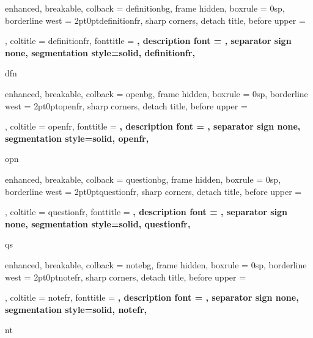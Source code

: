 {%
    enhanced,
    breakable,
    colback = definitionbg,
    frame hidden,
    boxrule = 0sp,
    borderline west = {2pt}{0pt}{definitionfr},
    sharp corners,
    detach title,
    before upper = \tcbtitle\par\smallskip,
    coltitle = definitionfr,
    fonttitle = \bfseries\sffamily,
    description font = \mdseries,
    separator sign none,
    segmentation style={solid, definitionfr},
}
{dfn}

{%
    enhanced,
    breakable,
    colback = openbg,
    frame hidden,
    boxrule = 0sp,
    borderline west = {2pt}{0pt}{openfr},
    sharp corners,
    detach title,
    before upper = \tcbtitle\par\smallskip,
    coltitle = openfr,
    fonttitle = \bfseries\sffamily,
    description font = \mdseries,
    separator sign none,
    segmentation style={solid, openfr},
}
{opn}

{%
    enhanced,
    breakable,
    colback = questionbg,
    frame hidden,
    boxrule = 0sp,
    borderline west = {2pt}{0pt}{questionfr},
    sharp corners,
    detach title,
    before upper = \tcbtitle\par\smallskip,
    coltitle = questionfr,
    fonttitle = \bfseries\sffamily,
    description font = \mdseries,
    separator sign none,
    segmentation style={solid, questionfr},
}
{qs}


{%
    enhanced,
    breakable,
    colback = notebg,
    frame hidden,
    boxrule = 0sp,
    borderline west = {2pt}{0pt}{notefr},
    sharp corners,
    detach title,
    before upper = \tcbtitle\par\smallskip,
    coltitle = notefr,
    fonttitle = \bfseries\sffamily,
    description font = \mdseries,
    separator sign none,
    segmentation style={solid, notefr},
}
{nt}

